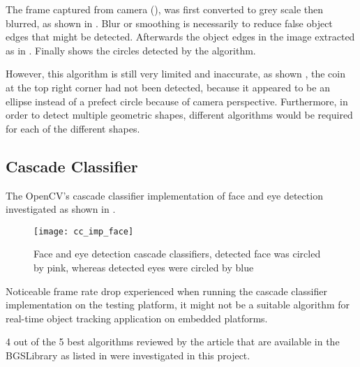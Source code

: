 The frame captured from camera (), was first converted to grey scale then blurred, as shown in . Blur or smoothing is necessarily to reduce false object edges that might be detected. Afterwards the object edges in the image  extracted as in . Finally  shows the circles detected by the algorithm.

However, this algorithm is still very limited and inaccurate, as shown  , the coin at the top right corner had not been detected, because it appeared to be an ellipse instead of a prefect circle because of  camera perspective. Furthermore, in order to detect multiple geometric shapes, different algorithms would be required for each of the different shapes.

\subsection{Cascade Classifier}


The OpenCV's cascade classifier implementation \cite{opencv:cc} of face and eye detection  investigated as shown in .

\begin{figure}[H]
  \centering
  \texttt{[image: cc\_imp\_face]}
  \caption{Face and eye detection cascade classifiers, detected face was circled by pink, whereas detected eyes were circled by blue}
  \label{Figure:cc_face}
\end{figure}

Noticeable frame rate drop  experienced when running the cascade classifier implementation on the testing platform,  it might not be a suitable algorithm for real-time object tracking application on embedded platforms.


4 out of the 5 best algorithms reviewed by the article \cite{bgs:article} that are available in the BGSLibrary as listed in  were investigated in this project.


